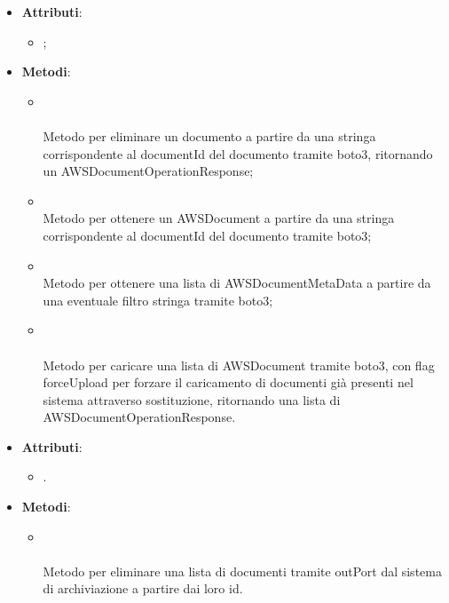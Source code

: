 \documentclass[10pt, a4paper]{article}
\begin{document}
\label{AWSS3ManagerDettaglio}
\begin{itemize}
    \item \textbf{Attributi}:
    \begin{itemize}
        \item {};
    \end{itemize}
    \item \textbf{Metodi}:
    \begin{itemize}
        \item {}\\ \\
        Metodo per eliminare un documento a partire da una stringa corrispondente al documentId del documento tramite boto3, ritornando un AWSDocumentOperationResponse;
        \item {}\\
        Metodo per ottenere un AWSDocument a partire da una stringa corrispondente al documentId del documento tramite boto3;
        \item {}\\
        Metodo per ottenere una lista di AWSDocumentMetaData a partire da una eventuale filtro stringa tramite boto3; 
        \item {}\\  \\ 
        Metodo per caricare una lista di AWSDocument tramite boto3, con flag forceUpload per forzare il caricamento di documenti già presenti nel sistema attraverso sostituzione, ritornando una lista di AWSDocumentOperationResponse.
    \end{itemize}
\end{itemize}


\label{DeleteDocumentsDettaglio}
\begin{itemize}
    \item \textbf{Attributi}:
    \begin{itemize}
        \item {}. 
    \end{itemize}
    \item \textbf{Metodi}:
    \begin{itemize}
        \item {}\\ \\
        Metodo per eliminare una lista di documenti tramite outPort dal sistema di archiviazione a partire dai loro id.
    \end{itemize}
\end{itemize}
\end{document}
